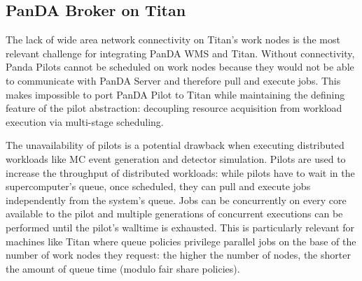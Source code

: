 

\subsection{PanDA Broker on Titan}
\label{ssec:panda_titan}

The lack of wide area network connectivity on Titan's work nodes is the most
relevant challenge for integrating PanDA WMS and Titan. Without connectivity,
Panda Pilots cannot be scheduled on work nodes because they would not be able to
communicate with PanDA Server and therefore pull and execute jobs. This makes
impossible to port PanDA Pilot to Titan while maintaining the defining feature
of the pilot abstraction: decoupling resource acquisition from workload
execution via multi-stage scheduling.

The unavailability of pilots is a potential drawback when executing distributed
workloads like MC event generation and detector simulation. Pilots are used to
increase the throughput of distributed workloads: while pilots have to wait in
the supercomputer's queue, once scheduled, they can pull and execute jobs
independently from the system's queue. Jobs can be concurrently on every core
available to the pilot and multiple generations of concurrent executions can be
performed until the pilot's walltime is exhausted. This is particularly relevant
for machines like Titan where queue policies privilege parallel jobs on the base
of the number of work nodes they request: the higher the number of nodes, the
shorter the amount of queue time (modulo fair share policies).


